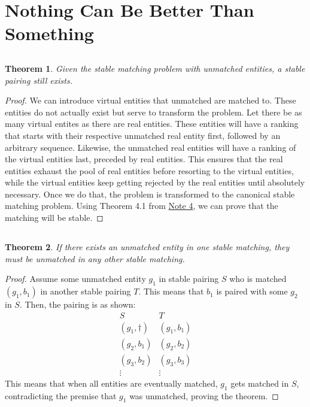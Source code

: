 \documentclass{article}
\newtheorem{theorem}{Theorem}
\begin{document}
\section{Nothing Can Be Better Than Something}

\subsection{}

\begin{theorem}
    Given the stable matching problem with unmatched entities, a stable pairing still exists.
\end{theorem}
\begin{proof}
    We can introduce virtual entities that unmatched are matched to.
    These entities do not actually exist but serve to transform the problem.
    Let there be as many virtual entites as there are real entities.
    These entities will have a ranking that starts with their respective unmatched real entity first, followed by an arbitrary sequence.
    Likewise, the unmatched real entities will have a ranking of the virtual entities last, preceded by real entities.
    This ensures that the real entities exhaust the pool of real entities before resorting to the virtual entities, while the virtual entities keep getting rejected by the real entities until absolutely necessary.
    Once we do that, the problem is transformed to the canonical stable matching problem.
    Using Theorem 4.1 from \href{https://www.eecs70.org/static/notes/n4.pdf}{Note 4}, we can prove that the matching will be stable.
\end{proof}

\subsection{}

\begin{theorem}
    If there exists an unmatched entity in one stable matching, they must be unmatched in any other stable matching.
\end{theorem}
\begin{proof}
    Assume some unmatched entity \(g_1\) in stable pairing \(S\) who is matched \((g_1, b_1)\) in another stable pairing \(T\).
    This means that \(b_1\) is paired with some \(g_2\) in \(S\).
    Then, the pairing is as shown:
    \begin{equation}
        \begin{array}{c|c}
            S & T \\
            \hline
            (g_1, \dagger) & (g_1, b_1) \\
            (g_2, b_1) & (g_2, b_2) \\
            (g_3, b_2) & (g_3, b_3) \\
            \vdots & \vdots
        \end{array}
    \end{equation}
    This means that when all entities are eventually matched, \(g_1\) gets matched in \(S\), contradicting the premise that \(g_1\) was unmatched, proving the theorem.
\end{proof}
\end{document}
